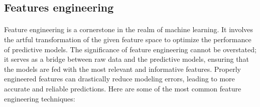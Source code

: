     \subsection{Features engineering}
        \paragraph{}Feature engineering\cite{khurana_feature_2017} is a cornerstone in the realm of machine learning. It involves the artful transformation of the given feature space to optimize the performance of predictive models. The significance of feature engineering cannot be overstated; it serves as a bridge between raw data and the predictive models, ensuring that the models are fed with the most relevant and informative features. Properly engineered features can drastically reduce modeling errors, leading to more accurate and reliable predictions. Here are some of the most common feature engineering techniques:

